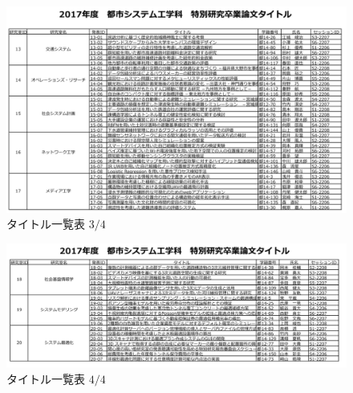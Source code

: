 \documentclass[a4paper,12pt,fleqn]{jarticle}
\begin{document}
\begin{figure}[H]
  \begin{center}
    \includegraphics[scale=0.7]{ti1.png}
    \caption{タイトル一覧表 $3/4$}
  \end{center}
\end{figure}

\begin{figure}[H]
  \begin{center}
    \includegraphics[scale=0.7]{ti2.png}
    \caption{タイトル一覧表 $4/4$}
  \end{center}
\end{figure}
\end{document}
